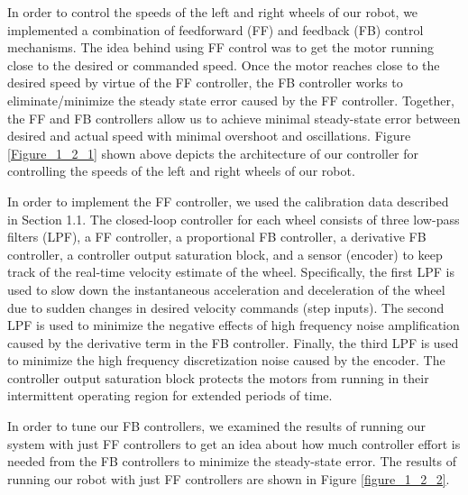 \documentclass[journal]{IEEEtran}
\begin{document}
In order to control the speeds of the left and right wheels of our robot, we implemented a combination of feedforward (FF) and feedback (FB) control mechanisms. The idea behind using FF control was to get the motor running close to the desired or commanded speed. Once the motor reaches close to the desired speed by virtue of the FF controller, the FB controller works to eliminate/minimize the steady state error caused by the FF controller. Together, the FF and FB controllers allow us to achieve minimal steady-state error between desired and actual speed with minimal overshoot and oscillations. Figure \ref{Figure_1_2_1} shown above depicts the architecture of our controller for controlling the speeds of the left and right wheels of our robot.

In order to implement the FF controller, we used the calibration data described in Section 1.1. The closed-loop controller for each wheel consists of three low-pass filters (LPF), a FF controller, a proportional FB controller, a derivative FB controller, a controller output saturation block, and a sensor (encoder) to keep track of the real-time velocity estimate of the wheel. Specifically, the first LPF is used to slow down the instantaneous acceleration and deceleration of the wheel due to sudden changes in desired velocity commands (step inputs). The second LPF is used to minimize the negative effects of high frequency noise amplification caused by the derivative term in the FB controller. Finally, the third LPF is used to minimize the high frequency discretization noise caused by the encoder. The controller output saturation block protects the motors from running in their intermittent operating region for extended periods of time.

In order to tune our FB controllers, we examined the results of running our system with just FF controllers to get an idea about how much controller effort is needed from the FB controllers to minimize the steady-state error. The results of running our robot with just FF controllers are shown in Figure \ref{figure_1_2_2}.
\end{document}
